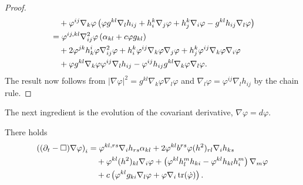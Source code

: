 \documentclass{amsart}
\begin{document}
\begin{proof}
\[\begin{split}
&\quad + \varphi^{ij} \nabla_k \varphi \left(\varphi g^{kl} \nabla_l h_{ij} + h^k_i \nabla_j \varphi + h^k_j \nabla_i \varphi - g^{kl} h_{ij} \nabla_l \varphi\right) \\
&= \varphi^{ij,kl} \nabla^2_{ij} \varphi \left(\alpha_{kl} + c \varphi g_{kl}\right) \\
&\quad + 2\varphi^{jk}h^{i}_{k}\varphi \nabla^2_{ij} \varphi + h^k_i \varphi^{ij} \nabla_k \varphi \nabla_j \varphi + h^k_j \varphi^{ij} \nabla_k \varphi \nabla_i \varphi \\
&\quad + \varphi g^{kl}\nabla_k \varphi \varphi^{ij} \nabla_l h_{ij} - \varphi^{ij} h_{ij} g^{kl}\nabla_k \varphi \nabla_l \varphi.
\end{split}
\]
The result now follows from \(|\nabla \varphi|^2 = g^{kl}\nabla_k \varphi \nabla_l \varphi\) and \(\nabla_l \varphi = \varphi^{ij} \nabla_l h_{ij}\) by the chain rule.
\end{proof}
The next ingredient is the evolution of the covariant derivative, \(\nabla \varphi = d\varphi\).
\begin{lemma}
\label{lem:Evgradphi}
There holds
\[
\begin{split}
\left((\partial_{t}-\Box)\nabla\varphi\right)_{i} &= \varphi^{kl,rs}\nabla_i h_{rs} \alpha_{kl} + 2 \varphi^{kl} b^{rs} \varphi(h^2)_{rl} \nabla_i h_{ks} \\
&\quad + \varphi^{kl}(h^2)_{kl}\nabla_i \varphi + \left(\varphi^{kl}h^{m}_{l}h_{ki} - \varphi^{kl}h_{kl}h^{m}_{i}\right) \nabla_m \varphi\\
&\quad + c\left(\varphi^{kl}g_{ki} \nabla_l \varphi + \varphi \nabla_i \operatorname{tr}(\dot{\varphi})\right).
\end{split}
\]
\end{lemma}
\end{document}
